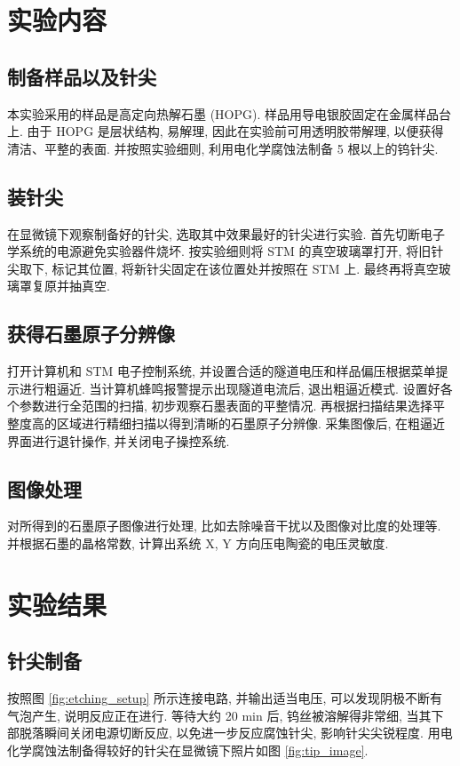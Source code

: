 \documentclass{whureport}
\begin{document}
\begin{multicols}{2}
\section{实验内容}
\subsection{制备样品以及针尖}
本实验采用的样品是高定向热解石墨 (HOPG). 样品用导电银胶固定在金属样品台上. 由于 HOPG 是层状结构, 易解理, 因此在实验前可用透明胶带解理, 以便获得清洁、平整的表面.
并按照实验细则, 利用电化学腐蚀法制备 5 根以上的钨针尖.

\subsection{装针尖}
在显微镜下观察制备好的针尖, 选取其中效果最好的针尖进行实验.
首先切断电子学系统的电源避免实验器件烧坏. 按实验细则将 STM 的真空玻璃罩打开, 将旧针尖取下, 标记其位置, 将新针尖固定在该位置处并按照在 STM 上. 最终再将真空玻璃罩复原并抽真空.

\subsection{获得石墨原子分辨像}
打开计算机和 STM 电子控制系统, 并设置合适的隧道电压和样品偏压根据菜单提示进行粗逼近.
当计算机蜂鸣报警提示出现隧道电流后, 退出粗逼近模式. 设置好各个参数进行全范围的扫描, 初步观察石墨表面的平整情况. 再根据扫描结果选择平整度高的区域进行精细扫描以得到清晰的石墨原子分辨像.
采集图像后, 在粗逼近界面进行退针操作, 并关闭电子操控系统.

\subsection{图像处理}
对所得到的石墨原子图像进行处理, 比如去除噪音干扰以及图像对比度的处理等. 并根据石墨的晶格常数, 计算出系统 X, Y 方向压电陶瓷的电压灵敏度.

\section{实验结果}
\subsection{针尖制备}
按照图 \ref{fig:etching_setup} 所示连接电路, 并输出适当电压, 可以发现阴极不断有气泡产生, 说明反应正在进行. 等待大约 20 min 后, 钨丝被溶解得非常细, 当其下部脱落瞬间关闭电源切断反应, 以免进一步反应腐蚀针尖, 影响针尖尖锐程度.
用电化学腐蚀法制备得较好的针尖在显微镜下照片如图 \ref{fig:tip_image}.


\end{multicols}
\end{document}
